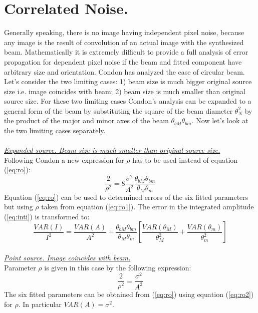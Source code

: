 \section{Correlated Noise.}
Generally speaking, there is no image having independent pixel noise,
because any image is the result of convolution of an actual image with
the synthesized beam.  Mathematically it is extremely difficult to
provide a full analysis of error propagation for dependent pixel noise
if the beam and fitted component have arbitrary size and orientation.
Condon \cite{jjcon} has analyzed the case of circular beam. Let's
consider the two limiting cases: 1) beam size is much bigger original
source size i.e. image coincides with beam; 2) beam size is much
smaller than original source size. For these two limiting cases
Condon's analysis can be expanded to a general form of the beam by
substituting the square of the beam diameter $\theta_N^2$ by the
product of the major and minor axes of the beam  $\theta_{bM
}\theta_{bm}$. Now let's look at the two limiting cases separately.\\
\\
\underline{\em Expanded source.  Beam size is much smaller than
original source size.}\\
Following Condon \cite{jjcon} a new expression for $\rho$ has to be
used instead of equation (\ref {eq:ro}):
\begin{equation}
\frac{2}{\rho^2} = 8 \frac{\sigma^2}{A^2} \frac{\theta_{bM}\theta_{bm}}
{\theta_{M}\theta_{m}}
\label{eq:ro1}
\end{equation}
Equation (\ref {eq:ro}) can be used to determined errors of the six
fitted parameters but using $\rho$ taken from equation (\ref{eq:ro1}).
The error in the  integrated amplitude (\ref{eq:inti}) is transformed
to:
\begin{equation}
\frac{VAR(I)}{I^2} = \frac{VAR(A)}{A^2} + \frac{\theta_{bM}\theta_{bm}}
{\theta_{M}\theta_{m}} \left[\frac{VAR(\theta_M)}{\theta_M^2} + \frac{VAR(\theta_m)}{\theta_m^2} \right]
\label{eq:int2}
\end{equation}
\\
\underline{\em Point source. Image coincides with beam.}\\
Parameter $\rho$ is given in this case by the following expression:
\begin{equation}
\frac{2}{\rho^2} = \frac{\sigma^2}{A^2}
\label{eq:ro2}
\end{equation}
The six fitted parameters can be obtained from (\ref {eq:ro}) using
equation (\ref{eq:ro2}) for $\rho$. In particular $VAR(A) = \sigma^2$.
